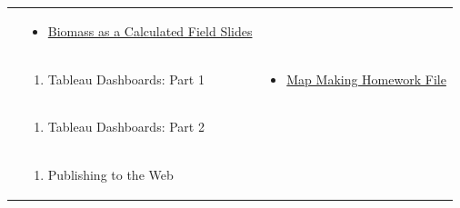 \documentclass[
]{book}
\providecommand{\tightlist}{%
  \setlength{\itemsep}{0pt}\setlength{\parskip}{0pt}}
\begin{document}
\begin{longtable}[]{@{}lll@{}}
\begin{minipage}[t]{0.34\columnwidth}
\end{minipage} & \begin{minipage}[t]{0.42\columnwidth}\raggedright
\begin{itemize}
\tightlist
\item
  \href{files/M3S4_calculated_field_biomass_example.pdf}{Biomass as a Calculated Field Slides}
\end{itemize}\strut
\end{minipage}\tabularnewline
\begin{minipage}[t]{0.15\columnwidth}\raggedright
\strut
\end{minipage} & \begin{minipage}[t]{0.34\columnwidth}\raggedright
\begin{enumerate}
\def\labelenumi{\arabic{enumi}.}
\setcounter{enumi}{4}
\tightlist
\item
  Tableau Dashboards: Part 1
\end{enumerate}\strut
\end{minipage} & \begin{minipage}[t]{0.42\columnwidth}\raggedright
\begin{itemize}
\tightlist
\item
  \href{files/M3S5_exercise_key.twbx}{Map Making Homework File}
\end{itemize}\strut
\end{minipage}\tabularnewline
\begin{minipage}[t]{0.15\columnwidth}\raggedright
\strut
\end{minipage} & \begin{minipage}[t]{0.34\columnwidth}\raggedright
\begin{enumerate}
\def\labelenumi{\arabic{enumi}.}
\setcounter{enumi}{5}
\tightlist
\item
  Tableau Dashboards: Part 2
\end{enumerate}\strut
\end{minipage} & \begin{minipage}[t]{0.42\columnwidth}\raggedright
\strut
\end{minipage}\tabularnewline
\begin{minipage}[t]{0.15\columnwidth}\raggedright
\strut
\end{minipage} & \begin{minipage}[t]{0.34\columnwidth}\raggedright
\begin{enumerate}
\def\labelenumi{\arabic{enumi}.}
\setcounter{enumi}{6}
\tightlist
\item
  Publishing to the Web

\end{enumerate}
\end{minipage}
\end{longtable}
\end{document}
